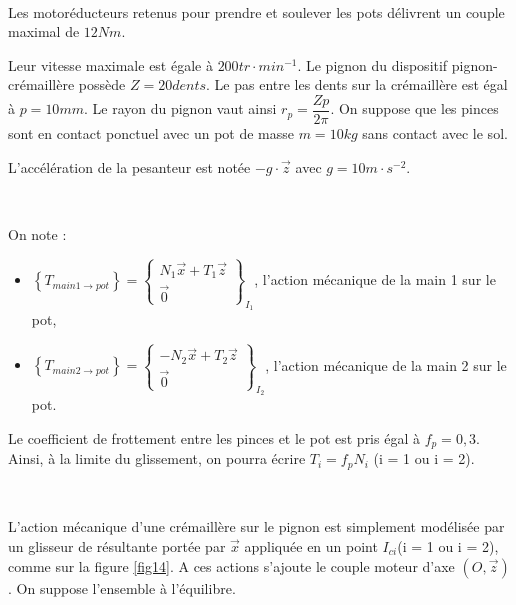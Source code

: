 
~\

Les motoréducteurs retenus pour prendre et soulever les pots délivrent un couple maximal de $12 Nm$.

Leur vitesse maximale est égale à $200tr\cdot min^{-1}$. Le pignon du dispositif pignon-crémaillère possède $Z = 20 dents$. Le pas entre les dents sur la crémaillère est égal à $p=10 mm$. Le rayon du pignon vaut ainsi $r_p=\dfrac{Zp}{2\pi}$. On suppose que les pinces sont en contact ponctuel avec un pot de masse $m=10 kg$ sans contact avec le sol.

L'accélération de la pesanteur est notée $-g\cdot\vec{z}$ avec $g=10m\cdot s^{-2}$.

~\

On note :
\begin{itemize}
 \item $\left\{T_{main1\rightarrow pot}\right\}=\left\{\begin{array}{c}
 N_1\vec{x}+T_1\vec{z}\\ \vec{0} \end{array} \right\}_{I_1}$, l'action mécanique de la main 1 sur le pot,
 \item $\left\{T_{main2\rightarrow pot}\right\}=\left\{\begin{array}{c}
 -N_2\vec{x}+T_2\vec{z}\\ \vec{0} \end{array} \right\}_{I_2}$, l'action mécanique de la main 2 sur le pot.
\end{itemize}

Le coefficient de frottement entre les pinces et le pot est pris égal à $f_p=0,3$. Ainsi, à la limite du glissement, on pourra écrire $T_i=f_pN_i$ (i = 1 ou i = 2).
 

~\

L'action mécanique d'une crémaillère sur le pignon est simplement modélisée par un glisseur de résultante portée par $\vec{x}$ appliquée en un point $I_{ci}$(i = 1 ou i = 2), comme sur la figure \ref{fig14}. A ces actions s'ajoute le couple moteur d'axe $(O,\vec{z})$. On suppose l'ensemble à l'équilibre.

